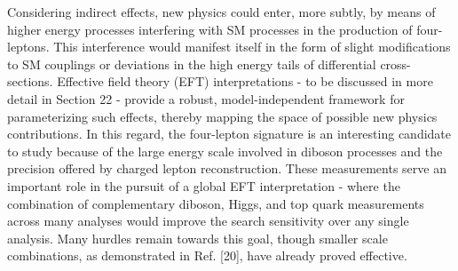 Considering indirect effects, new physics could enter, more subtly, by means of higher energy processes interfering with SM processes in the production of four-leptons. This interference would manifest itself in the form of slight modifications to SM couplings or deviations in the high energy tails of differential cross-sections. Effective field theory (EFT) interpretations - to be discussed in more detail in Section 22 - provide a robust, model-independent framework for parameterizing such effects, thereby mapping the space of possible new physics contributions. In this regard, the four-lepton signature is an interesting candidate to study because of the large energy scale involved in diboson processes and the precision offered by charged lepton reconstruction. These measurements serve an important role in the pursuit of a global EFT interpretation - where the combination of complementary diboson, Higgs, and top quark measurements across many analyses would improve the search sensitivity over any single analysis. Many hurdles remain towards this goal, though smaller scale combinations, as demonstrated in Ref. [20], have already proved effective.
